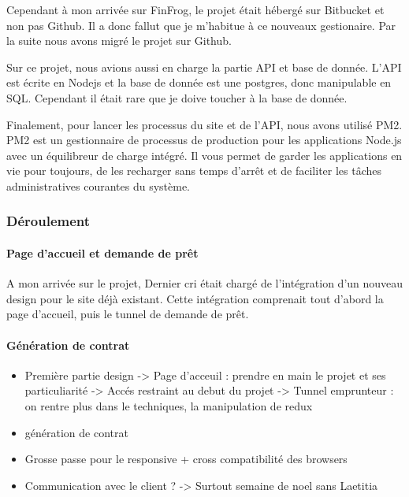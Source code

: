 \documentclass[12pt,a4paper]{article}
\begin{document}
  \bigskip

  Cependant à mon arrivée sur FinFrog, le projet était hébergé sur
  Bitbucket et non pas Github. Il a donc fallut que je m'habitue à ce
  nouveaux gestionaire. Par la suite nous avons migré le projet sur
  Github.

  \bigskip

  Sur ce projet, nous avions aussi en charge la partie API et base de
  donnée. L'API est écrite en Nodejs et la base de donnée est une
  postgres, donc manipulable en SQL. Cependant il était rare que je doive
  toucher à la base de donnée.

  \bigskip

  Finalement, pour lancer les processus du site et de l'API, nous avons
  utilisé PM2. PM2 est un gestionnaire de processus de production pour les
  applications Node.js avec un équilibreur de charge intégré. Il vous
  permet de garder les applications en vie pour toujours, de les recharger
  sans temps d'arrêt et de faciliter les tâches administratives courantes
  du système.

  \bigskip

  \subsubsection{Déroulement}\label{duxe9roulement-1}

  \paragraph{Page d'accueil et demande de
  prêt}\label{page-daccueil-et-demande-de-pruxeat}

  \bigskip

  A mon arrivée sur le projet, Dernier cri était chargé de l'intégration
  d'un nouveau design pour le site déjà existant. Cette intégration
  comprenait tout d'abord la page d'accueil, puis le tunnel de demande de
  prêt.

  \bigskip

  \bigskip

  \paragraph{Génération de contrat}\label{guxe9nuxe9ration-de-contrat}

  \bigskip

  \bigskip

  \begin{itemize}
  \item
    Première partie design -\textgreater{} Page d'acceuil : prendre en
    main le projet et ses particuliarité -\textgreater{} Accés restraint
    au debut du projet -\textgreater{} Tunnel emprunteur : on rentre plus
    dans le techniques, la manipulation de redux
  \item
    génération de contrat
  \item
    Grosse passe pour le responsive + cross compatibilité des browsers
  \item
    Communication avec le client ? -\textgreater{} Surtout semaine de noel
    sans Laetitia
  \end{itemize}
\end{document}
